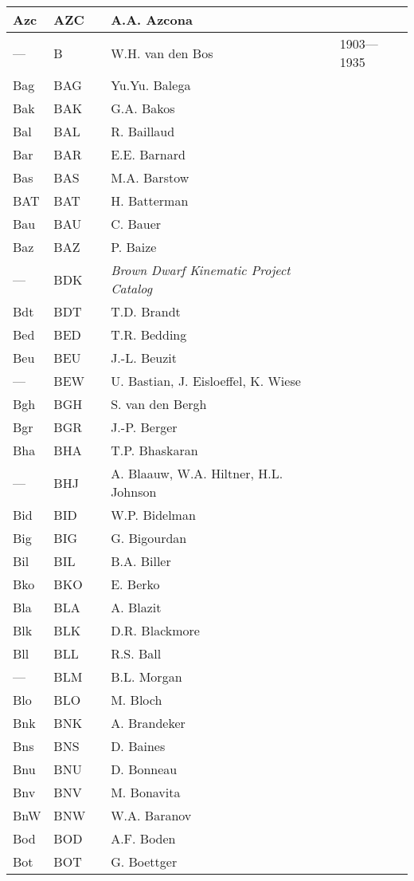 \begin{longtable}{l|l|c|p{59mm}|l}
Azc & AZC &   & A.A. Azcona & \\\midrule
---	& B   &   & W.H. van den Bos & 1903---1935 \\
Bag & BAG &   & Yu.Yu. Balega & \\
Bak & BAK &   & G.A. Bakos & \\
Bal & BAL &   & R. Baillaud & \\
Bar & BAR &   & E.E. Barnard & \\
Bas & BAS &   & M.A. Barstow & \\
BAT & BAT &   & H. Batterman & \\
Bau & BAU &   & C. Bauer & \\
Baz & BAZ &   & P. Baize & \\
--- & BDK &   & \emph{Brown Dwarf Kinematic Project Catalog} & \\
Bdt & BDT &   & T.D. Brandt & \\
Bed & BED &   & T.R. Bedding & \\
Beu & BEU &   & J.-L. Beuzit & \\
--- & BEW &   & U. Bastian, J. Eisloeffel, K. Wiese & \\
Bgh & BGH &   & S. van den Bergh & \\
Bgr & BGR &   & J.-P. Berger & \\
Bha & BHA &   & T.P. Bhaskaran & \\
--- & BHJ &   & A. Blaauw, W.A. Hiltner, H.L. Johnson & \\
Bid & BID &   & W.P. Bidelman & \\
Big & BIG &   & G. Bigourdan & \\
Bil & BIL &   & B.A. Biller & \\
Bko & BKO &   & E. Berko & \\
Bla & BLA &   & A. Blazit & \\
Blk & BLK &   & D.R. Blackmore & \\
Bll & BLL &   & R.S. Ball & \\
--- & BLM &   & B.L. Morgan & \\
Blo & BLO &   & M. Bloch & \\
Bnk & BNK &   & A. Brandeker & \\
Bns & BNS &   & D. Baines & \\
Bnu & BNU &   & D. Bonneau & \\
Bnv & BNV &   & M. Bonavita & \\
BnW & BNW &   & W.A. Baranov & \\
Bod & BOD &   & A.F. Boden & \\
Bot & BOT &   & G. Boettger & \\

\end{longtable}
